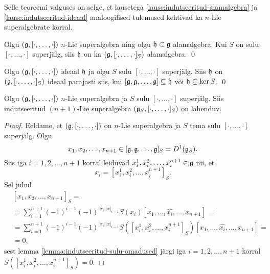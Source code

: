 Selle teoreemi valguses on selge, et lausetega
\ref{lause:indutseeritud-alamalgebra} ja
\ref{lause:indutseeritud-ideaal} analoogilised tulemused
kehtivad ka $n$-Lie superalgebrate korral.

\begin{lau}
    Olgu $(\mathfrak{g}, [\cdot, \dots, \cdot])$ $n$-Lie superalgebra ning
    olgu $\mathfrak{h} \subset \mathfrak{g}$ alamalgebra. Kui $S$ on
    sulu $[\cdot, \dots, \cdot]$ superjälg,
    siis $\mathfrak{h}$ on ka $(\mathfrak{g}, [\cdot, \dots, \cdot]_S)$ alamalgebra.
    \hfill \qed
\end{lau}

\begin{lau}
    Olgu $(\mathfrak{g}, [\cdot, \dots, \cdot])$ ideaal $\mathfrak{h}$ ja olgu
    $S$ sulu $[\cdot, \dots, \cdot]$ superjälg. Siis $\mathfrak{h}$ on
    $(\mathfrak{g}, [\cdot, \dots, \cdot]_S)$ ideaal parajasti siis, kui
    $[\mathfrak{g}, \mathfrak{g}, \dots, \mathfrak{g}] \subseteq \mathfrak{h}$ või $\mathfrak{h} \subseteq \ker S$.
    \hfill \qed
\end{lau}

\begin{lau}
    Olgu $(\mathfrak{g}, [\cdot, \dots, \cdot])$ $n$-Lie superalgebra ja
    $S$ sulu $[\cdot, \dots, \cdot]$ superjälg. Siis indutseeritud
    $(n+1)$-Lie superalgebra $(\mathfrak{g}_S, [\cdot, \dots, \cdot]_S)$
    on lahenduv.
\end{lau}

\begin{proof}
    Eeldame, et $(\mathfrak{g}, [\cdot, \dots, \cdot])$ on $n$-Lie
    superalgebra ja $S$ tema sulu $[\cdot, \dots, \cdot]$ superjälg.
    Olgu
    \[
        x_1, x_2, \dots, x_{n+1} \in
        [\mathfrak{g}, \mathfrak{g}, \dots, \mathfrak{g}]_S = D^1(\mathfrak{g}_S).
    \]
    Siis iga $i = 1, 2, \dots, n+1$ korral leiduvad
    $x_i^1, x_i^2, \dots, x_i^{n+1} \in \mathfrak{g}$ nii, et
    \[
        x_i = [x_i^1, x_i^2, \dots, x_i^{n+1}]_S.
    \]
    Sel juhul
    \begin{align*}
        &[x_1, x_2, \dots, x_{n+1}]_S = \\
        &= \sum_{i=1}^{n+1} (-1)^{i-1} (-1)^{|x_i||x|_{i-1}}
            S(x_i) [x_1, \dots, \hat{x_i}, \dots, x_{n+1}] = \\
        &= \sum_{i=1}^{n+1} (-1)^{i-1} (-1)^{|x_i||x|_{i-1}}
            S([x_i^1, x_i^2, \dots, x_i^{n+1}]_S)
            [x_1, \dots, \hat{x_i}, \dots, x_{n+1}] = \\
        &= 0,
    \end{align*}
    sest lemma \ref{lemma:indutseeritud-sulu-omadused} järgi
    iga $i = 1, 2, \dots, n+1$ korral
    $S([x_i^1, x_i^2, \dots, x_i^{n+1}]_S) = 0$.
\end{proof}

